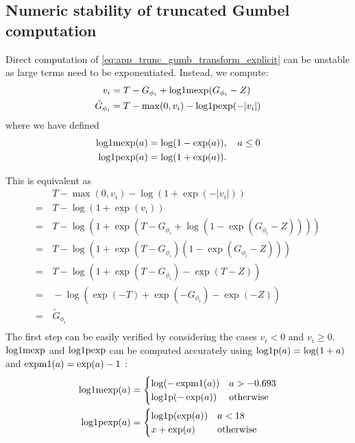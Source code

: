 \subsection{Numeric stability of truncated Gumbel computation}
\label{app:trunc_gumbel_numeric_stability}
Direct computation of \eqref{eq:app_trunc_gumb_transform_explicit} can be unstable as large terms need to be exponentiated. Instead, we compute:
\begin{align}
    v_i &= T - G_{\phi_i} + \operatorname{log1mexp}(G_{\phi_i} - Z) \label{eq:sample_truncated_gumbel_vi} \\
    \tilde{G}_{\phi_i} &= T - \max(0, v_i) - \operatorname{log1pexp}(-|v_i|)  \label{eq:sample_truncated_gumbel_stable}
\end{align}
where we have defined
\begin{align*}
    \operatorname{log1mexp}(a) &= \log(1-\exp(a)), \quad a \le 0 \\
    \operatorname{log1pexp}(a) &= \log(1+\exp(a)).
\end{align*}

This is equivalent as
\begin{align*}
    & \, T - \max(0, v_i) - \log(1 + \exp(-|v_i|)) \\
    =& \, T - \log(1 + \exp(v_i)) \\
    =& \, T - \log\left(1 + \exp\left(T - G_{\phi_i} + \log\left(1-\exp\left(G_{\phi_i} - Z\right)\right)\right)\right) \\
    =& \, T - \log\left(1 + \exp\left(T - G_{\phi_i}\right) \left(1-\exp\left(G_{\phi_i} - Z\right)\right)\right) \\
    =& \, T - \log\left(1 + \exp\left(T - G_{\phi_i}\right) - \exp\left(T - Z\right)\right) \\
    =& \, -\log\left(\exp(-T) + \exp(- G_{\phi_i}) - \exp(- Z)\right) \\
    =& \, \tilde{G}_{\phi_i} \\
\end{align*}
The first step can be easily verified by considering the cases $v_i < 0$ and $v_i \ge 0$. 
$\operatorname{log1mexp}$ and $\operatorname{log1pexp}$ can be computed accurately using $\operatorname{log1p}(a) = \log(1+a)$ and $\operatorname{expm1}(a) = \exp(a) - 1$ \citep{machler2012accurately}:
\begin{align*}
    \operatorname{log1mexp}(a) &= \begin{cases}
    \log(-\operatorname{expm1}(a)) & a > -0.693 \\
    \operatorname{log1p}(-\exp(a)) & \text{otherwise} \\
    \end{cases} \\
    \operatorname{log1pexp}(a) &= \begin{cases}
    \operatorname{log1p}(\exp(a)) & a < 18 \\
    x + \exp(a) & \text{otherwise} \\
    \end{cases}
\end{align*}

